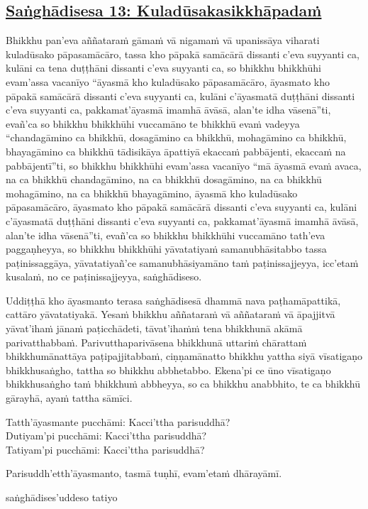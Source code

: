 \subsection*{\hyperref[comm13]{Saṅghādisesa 13: Kuladūsakasikkhāpadaṁ}}
\label{sd13}
Bhikkhu pan'eva aññataraṁ gāmaṁ vā nigamaṁ vā upanissāya viharati kuladūsako pāpasamācāro, tassa kho pāpakā samācārā dissanti c'eva suyyanti ca, kulāni ca tena duṭṭhāni dissanti c'eva suyyanti ca, so bhikkhu bhikkhūhi evam'assa vacanīyo “āyasmā kho kuladūsako pāpasamācāro, āyasmato kho pāpakā samācārā dissanti c'eva suyyanti ca, kulāni c'āyasmatā duṭṭhāni dissanti c'eva suyyanti ca, pakkamat'āyasmā imamhā āvāsā, alan'te idha vāsenā”ti, evañ'ca so bhikkhu bhikkhūhi vuccamāno te bhikkhū evaṁ vadeyya “chandagāmino ca bhikkhū, dosagāmino ca bhikkhū, mohagāmino ca bhikkhū, bhayagāmino ca bhikkhū tādisikāya āpattiyā ekaccaṁ pabbājenti, ekaccaṁ na pabbājentī”ti, so bhikkhu bhikkhūhi evam'assa vacanīyo “mā āyasmā evaṁ avaca, na ca bhikkhū chandagāmino, na ca bhikkhū dosagāmino, na ca bhikkhū mohagāmino, na ca bhikkhū bhayagāmino, āyasmā kho kuladūsako pāpasamācāro, āyasmato kho pāpakā samācārā dissanti c'eva suyyanti ca, kulāni c'āyasmatā duṭṭhāni dissanti c'eva suyyanti ca, pakkamat'āyasmā imamhā āvāsā, alan'te idha vāsenā”ti, evañ'ca so bhikkhu bhikkhūhi vuccamāno tath'eva paggaṇheyya, so bhikkhu bhikkhūhi yāvatatiyaṁ samanubhāsitabbo tassa paṭinissaggāya, yāvatatiyañ'ce samanubhāsiyamāno taṁ paṭinissajjeyya, icc'etaṁ kusalaṁ, no ce paṭinissajjeyya, saṅghādiseso.

\medskip

\begin{center}
Uddiṭṭhā kho āyasmanto terasa saṅghādisesā dhammā nava paṭhamāpattikā, cattāro yāvatatiyakā. Yesaṁ bhikkhu aññataraṁ vā aññataraṁ vā āpajjitvā yāvat'ihaṁ jānaṁ paṭicchādeti, tāvat'ihaṁṁ tena bhikkhunā akāmā parivatthabbaṁ. Parivutthaparivāsena bhikkhunā uttariṁ chārattaṁ bhikkhumānattāya paṭipajjitabbaṁ, ciṇṇamānatto bhikkhu yattha siyā vīsatigaṇo bhikkhusaṅgho, tattha so bhikkhu abbhetabbo. Ekena'pi ce ūno vīsatigaṇo bhikkhusaṅgho taṁ bhikkhuṁ abbheyya, so ca bhikkhu anabbhito, te ca bhikkhū gārayhā, ayaṁ tattha sāmīci.

\smallskip

Tatth'āyasmante pucchāmi: Kacci'ttha parisuddhā?\\
Dutiyam'pi pucchāmi: Kacci'ttha parisuddhā?\\
Tatiyam'pi pucchāmi: Kacci'ttha parisuddhā?

\smallskip

Parisuddh'etth'āyasmanto, tasmā tuṇhī, evam'etaṁ dhārayāmī.
\end{center}

\begin{outro}
  saṅghādises'uddeso tatiyo
\end{outro}

\clearpage
